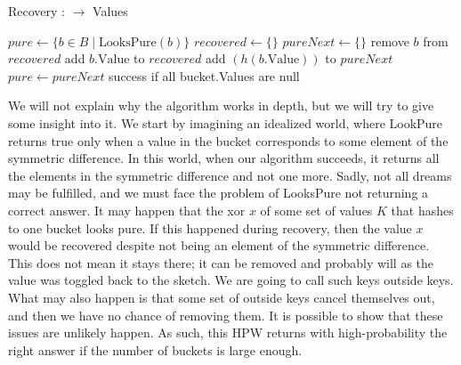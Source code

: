 \begin{algorithm}
\caption{Recovery : $\to$ Values}
\begin{algorithmic}[1]
    \State $pure \gets \{ b \in B \mid \text{LooksPure}(b) \}$
    \State $recovered \gets \{\}$
        \State $pureNext \gets \{\}$
                \State remove $b$ from $recovered$
            \Else
                \State add $b.\text{Value}$ to $recovered$
                \State {}
                    \State add $(h(b.\text{Value}))$ to $pureNext$
                \EndFor
            \EndIf
        \EndFor
        \State $pure \gets pureNext$
            \State \Return success if all bucket.Values are null
        \EndIf
    \EndWhile
\EndProcedure
\end{algorithmic}
\end{algorithm}
We will not explain why the algorithm works in depth, but we will try to give some insight into it. We start by imagining an idealized world, where LookPure returns true only when a value in the bucket corresponds to some element of the symmetric difference. In this world, when our algorithm succeeds, it returns all the elements in the symmetric difference and not one more. Sadly, not all dreams may be fulfilled, and we must face the problem of LooksPure not returning a correct answer.
It may happen that the xor $x$ of some set of values $K$ that hashes to one bucket looks pure. If this happened during recovery, then the value $x$ would be recovered despite not being an element of the symmetric difference. This does not mean it stays there; it can be removed and probably will as the value was toggled back to the sketch. We are going to call such keys outside keys. 
What may also happen is that some set of outside keys cancel themselves out, and then we have no chance of removing them.
It is possible to show that these issues are unlikely happen. As such, this HPW returns with high-probability the right answer if the number of buckets is large enough.